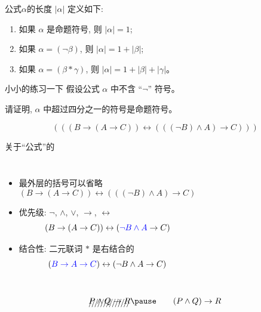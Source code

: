 \begin{frame}{}
  \begin{definition}[公式的长度]
    公式$\alpha$的长度 $|\alpha|$ 定义如下: \\[3pt]
    \begin{enumerate}[(1)]
      \setlength{\itemsep}{8pt}
      \item 如果 $\alpha$ 是命题符号, 则 $|\alpha| = 1$;
      \item 如果 $\alpha = (\lnot \beta)$, 则 $|\alpha| = 1 + |\beta|$;
      \item 如果 $\alpha = (\beta \ast \gamma)$, 则 $|\alpha| = 1 + |\beta| + |\gamma|$。
    \end{enumerate}
  \end{definition}

  \pause
  \vspace{0.30cm}
  \begin{exampleblock}{小小的练习一下}
    假设公式 $\alpha$ 中不含 ``$\lnot$'' 符号。

    请证明, $\alpha$ 中超过四分之一的符号是命题符号。
  \end{exampleblock}
\end{frame}

\begin{frame}{}
  \[
    (((B \to (A \to C)) \leftrightarrow (((\lnot B) \land A) \to C)))
  \]

  \pause
  \vspace{0.20cm}
  \begin{center}
    关于``公式''的
    \begin{columns}
        \begin{itemize}
          \setlength{\itemsep}{6pt}
          \item 最外层的括号可以省略
            \[
              (B \to (A \to C)) \leftrightarrow (((\lnot B) \land A) \to C)
            \]
          \item 优先级: $\lnot$, $\land$, $\lor$, $\to$, $\leftrightarrow$
            \[
              (B \to (A \to C)) \leftrightarrow (\textcolor{blue}{\lnot B \land A} \to C)
            \]
          \item 结合性: 二元联词 $\ast$ 是右结合的
            \[
              (\textcolor{blue}{B \to A \to C}) \leftrightarrow (\lnot B \land A \to C)
            \]
        \end{itemize}
    \end{columns}

    \pause
    \vspace{1em}
    \[
      \xout{P \land Q \to R} \pause \qquad
      (P \land Q) \to R
    \]
  \end{center}
\end{frame}

